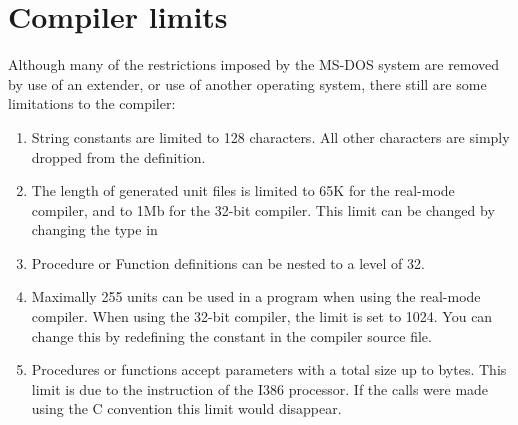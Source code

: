 \documentclass{report}
\begin{document}

\chapter{Compiler limits}
\label{ch:AppC}
Although many of the restrictions imposed by the MS-DOS system are removed
by use of an extender, or use of another operating system, there still are
some limitations to the compiler:
\begin{enumerate}
\item String constants are limited to 128 characters. All other characters
are simply dropped from the definition.
\item The length of generated unit files is limited to 65K for the
real-mode compiler, and to 1Mb for the 32-bit compiler. This limit can be
changed by changing the  type in 
\item Procedure or Function definitions can be nested to a level of 32.
\item Maximally 255 units can be used in a program when using the real-mode
compiler. When using the 32-bit compiler, the limit is set to 1024. You can
change this by redefining the  constant in the
 compiler source file.
\item Procedures or functions accept parameters with a total size up to 
 bytes. This limit is due to the  instruction of the I386
processor. If the calls were made using the C convention this limit would
disappear.
\end{enumerate}


\end{document}
